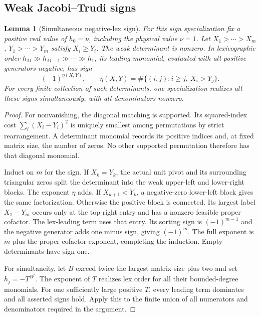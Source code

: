 \documentclass[11pt,a4paper]{amsart}
\numberwithin{equation}{section}
\theoremstyle{plain}
\newtheorem{lemma}[theorem]{Lemma}
\theoremstyle{definition}
\begin{document}
\subsection{Weak Jacobi--Trudi signs}
\begin{lemma}[Simultaneous negative-lex sign]\label{lem:weak-sign}
For this sign specialization fix a positive real value of \(h_0=\nu\),
including the physical value \(\nu=1\).
Let \(X_1>\cdots>X_m\), \(Y_1>\cdots>Y_m\) satisfy \(X_i\ge Y_i\).  The weak determinant is nonzero.  In lexicographic order \(h_M\gg h_{M-1}\gg\cdots\gg h_1\), its leading monomial, evaluated with all positive generators negative, has sign
\[
 (-1)^{\eta(X,Y)},\qquad
 \eta(X,Y)=\#\{(i,j):i\ge j,\ X_i>Y_j\}.
\]
For every finite collection of such determinants, one specialization realizes all these signs simultaneously, with all denominators nonzero.
\end{lemma}
\begin{proof}
For nonvanishing, the diagonal matching is supported.  Its squared-index cost \(\sum_i(X_i-Y_i)^2\) is uniquely smallest among permutations by strict rearrangement.  A determinant monomial records its positive indices and, at fixed matrix size, the number of zeros.  No other supported permutation therefore has that diagonal monomial.

Induct on \(m\) for the sign.  If \(X_k=Y_k\), the actual unit pivot and its surrounding triangular zeros split the determinant into the weak upper-left and lower-right blocks.  The exponent \(\eta\) adds.  If \(X_{k+1}<Y_k\), a negative-zero lower-left block gives the same factorization.  Otherwise the positive block is connected.  Its largest label \(X_1-Y_m\) occurs only at the top-right entry and has a nonzero feasible proper cofactor.  The lex-leading term uses that entry.  Its sorting sign is \((-1)^{m-1}\) and the negative generator adds one minus sign, giving \((-1)^m\).  The full exponent is \(m\) plus the proper-cofactor exponent, completing the induction.  Empty determinants have sign one.

For simultaneity, let \(B\) exceed twice the largest matrix size plus two and set \(h_j=-T^{B^j}\).  The exponent of \(T\) realizes lex order for all their bounded-degree monomials.  For one sufficiently large positive \(T\), every leading term dominates and all asserted signs hold.  Apply this to the finite union of all numerators and denominators required in the argument.
\end{proof}
\end{document}
